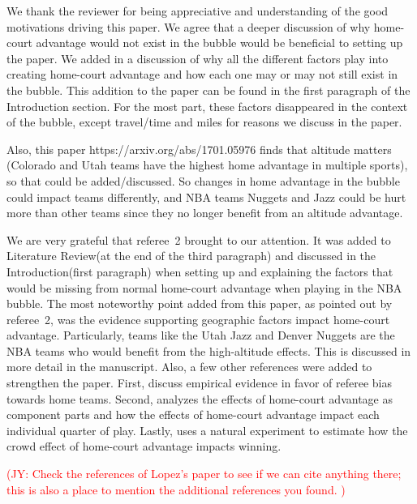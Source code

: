 \documentclass[12pt]{article}
\newcommand{\jy}[1]{\textcolor{red}{(JY: #1)}}
\newenvironment{comment}%
{\begin{quoting}\noindent\small\it\ignorespaces%
  }{\end{quoting}}
\begin{document}
 We thank the reviewer for being appreciative and understanding of the 
 good motivations driving this paper. We agree that a deeper discussion 
 of why home-court advantage would not exist in the bubble would be beneficial 
 to setting up the paper. We added in a discussion of why all the different 
 factors play into creating home-court advantage and how each one may or may 
 not still exist in the bubble. This addition to the paper can be found in the first paragraph
 of the Introduction section. For the most part, these factors disappeared 
 in the context of the bubble, except travel/time and miles for reasons we
 discuss in the paper. 

\begin{comment}
Also, this paper https://arxiv.org/abs/1701.05976 finds that altitude matters
(Colorado and Utah teams have the highest home advantage in multiple sports),
so that could be added/discussed. So changes in home advantage in the bubble
could impact teams differently, and NBA teams Nuggets and Jazz could be hurt
more than other teams since they no longer benefit from an altitude advantage.
\end{comment}

 We are very grateful that referee~2 brought \citet{Lopez} to our attention. 
 It was added to Literature Review(at the end of the third paragraph) and
 discussed in the Introduction(first paragraph) when setting 
 up and explaining the factors that would be missing from normal home-court 
 advantage when playing in the NBA bubble. The most noteworthy point added 
 from this paper, as pointed out by referee~2, was the evidence supporting 
 geographic factors impact home-court advantage. Particularly, teams like 
 the Utah Jazz and Denver Nuggets are the NBA teams who would benefit from 
 the high-altitude effects. This is discussed in more detail in the manuscript.
  Also, a few other references were added to strengthen the paper.
  First, \cite{Price} discuss empirical evidence in favor of referee bias towards
  home teams. Second, \cite{Jones} analyzes the effects of home-court advantage
  as component parts and how the effects of home-court advantage impact each 
  individual quarter of play. Lastly, \cite{Boudreaux} uses a natural
  experiment to estimate how the crowd effect of home-court advantage impacts winning.

 \jy{Check the references of Lopez's paper to see if we can cite
   anything there; this is also a place to mention the additional
   references you found. }
\end{document}
